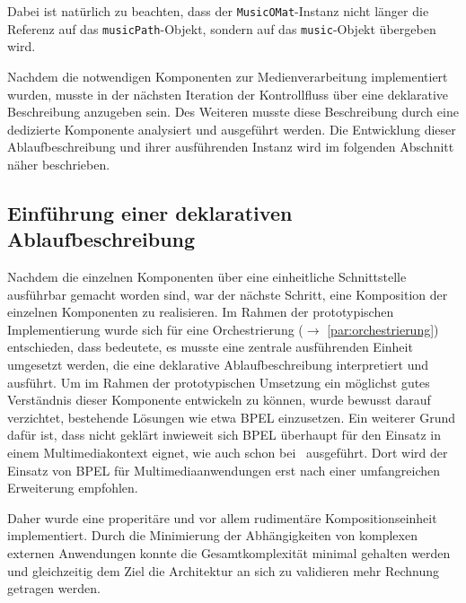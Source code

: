   Dabei ist natürlich zu beachten, dass der \verb!MusicOMat!-Instanz nicht länger die Referenz auf das \verb!musicPath!-Objekt, sondern auf das \verb!music!-Objekt übergeben wird.
  
  Nachdem die notwendigen Komponenten zur Medienverarbeitung implementiert wurden, musste in der nächsten Iteration der Kontrollfluss über eine deklarative Beschreibung anzugeben sein. Des Weiteren musste diese Beschreibung durch eine dedizierte Komponente analysiert und ausgeführt werden. Die Entwicklung dieser Ablaufbeschreibung und ihrer ausführenden Instanz wird im folgenden Abschnitt näher beschrieben.
  
  
\subsection{Einführung einer deklarativen Ablaufbeschreibung} %
\label{sub:einfuehrung_einer_deklarativen_ablaufbeschreibung}

  Nachdem die einzelnen Komponenten über eine einheitliche Schnittstelle ausführbar gemacht worden sind, war der nächste Schritt, eine Komposition der einzelnen Komponenten zu realisieren. Im Rahmen der prototypischen Implementierung wurde sich für eine Orchestrierung ($\to$ \ref{par:orchestrierung}) entschieden, dass bedeutete, es musste eine zentrale ausführenden Einheit umgesetzt werden, die eine deklarative Ablaufbeschreibung interpretiert und ausführt. Um im Rahmen der prototypischen Umsetzung ein möglichst gutes Verständnis dieser Komponente entwickeln zu können, wurde bewusst darauf verzichtet, bestehende Lösungen wie etwa BPEL einzusetzen. Ein weiterer Grund dafür ist, dass nicht geklärt inwieweit sich BPEL überhaupt für den Einsatz in einem Multimediakontext eignet, wie auch schon bei~\citep{samma08} ausgeführt. Dort wird der Einsatz von BPEL für Multimediaanwendungen erst nach einer umfangreichen Erweiterung empfohlen.
  
  Daher wurde eine properitäre und vor allem rudimentäre Kompositionseinheit implementiert. Durch die Minimierung der Abhängigkeiten von komplexen externen Anwendungen konnte die Gesamtkomplexität minimal gehalten werden und gleichzeitig dem Ziel die Architektur an sich zu validieren mehr Rechnung getragen werden. 
  
